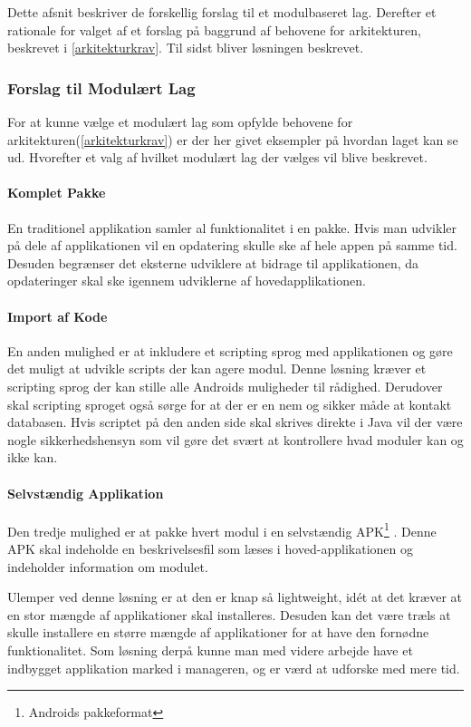 
Dette afsnit beskriver de forskellig forslag til et modulbaseret lag.
Derefter et rationale for valget af et forslag på baggrund af behovene for arkitekturen, beskrevet i \cref{arkitekturkrav}.
Til sidst bliver løsningen beskrevet.
\subsubsection{Forslag til Modulært Lag}
For at kunne vælge et modulært lag som opfylde behovene for arkitekturen(\cref{arkitekturkrav}) er der her givet eksempler på hvordan laget kan se ud.
Hvorefter et valg af hvilket modulært lag der vælges vil blive beskrevet.

\paragraph{Komplet Pakke}
En traditionel applikation samler al funktionalitet i en pakke.
Hvis man udvikler på dele af applikationen vil en opdatering skulle ske af hele appen på samme tid.
Desuden begrænser det eksterne udviklere at bidrage til applikationen, da opdateringer skal ske igennem udviklerne af hovedapplikationen.

\paragraph{Import af Kode}
En anden mulighed er at inkludere et scripting sprog med applikationen og gøre det muligt at udvikle scripts der kan agere modul.
Denne løsning kræver et scripting sprog der kan  stille alle Androids muligheder til rådighed.
Derudover skal scripting sproget også sørge for at der er en nem og sikker måde at kontakt databasen.
Hvis scriptet på den anden side skal skrives direkte i Java vil der være nogle sikkerhedshensyn som vil gøre det svært at kontrollere hvad moduler kan og ikke kan.

\paragraph{Selvstændig Applikation}
Den tredje mulighed er at pakke hvert modul i en selvstændig APK\footnote{Androids pakkeformat} \citep{misc:apk}.
Denne APK skal indeholde en beskrivelsesfil som læses i hoved-applikationen og indeholder information om modulet.

Ulemper ved denne løsning er at den er knap så lightweight, idét at det kræver at en stor mængde af applikationer skal installeres.
Desuden kan det være træls at skulle installere en større mængde af applikationer for at have den fornødne funktionalitet.
Som løsning derpå kunne man med videre arbejde have et indbygget applikation marked i manageren, og er værd at udforske med mere tid.

